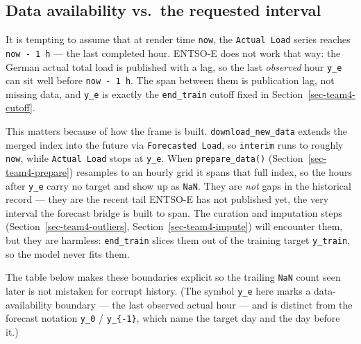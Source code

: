 \documentclass[
  english,
  letterpaper,
]{scrbook}
\begin{document}
\subsection{Data availability vs.~the requested
interval}\label{sec-team4-availability}

It is tempting to assume that at render time \texttt{now}, the
\texttt{Actual\ Load} series reaches \texttt{now\ -\ 1\ h} --- the last
completed hour. ENTSO-E does not work that way: the German actual total
load is published with a lag, so the last \emph{observed} hour
\texttt{y\_e} can sit well before \texttt{now\ -\ 1\ h}. The span
between them is publication lag, not missing data, and \texttt{y\_e} is
exactly the \texttt{end\_train} cutoff fixed in
Section~\ref{sec-team4-cutoff}.

This matters because of how the frame is built.
\texttt{download\_new\_data} extends the merged index into the future
via \texttt{Forecasted\ Load}, so \texttt{interim} runs to roughly
\texttt{now}, while \texttt{Actual\ Load} stops at \texttt{y\_e}. When
\texttt{prepare\_data()} (Section~\ref{sec-team4-prepare}) resamples to
an hourly grid it spans that full index, so the hours after
\texttt{y\_e} carry no target and show up as \texttt{NaN}. They are
\emph{not} gaps in the historical record --- they are the recent tail
ENTSO-E has not published yet, the very interval the forecast bridge is
built to span. The curation and imputation steps
(Section~\ref{sec-team4-outliers}, Section~\ref{sec-team4-impute}) will
encounter them, but they are harmless: \texttt{end\_train} slices them
out of the training target \texttt{y\_train}, so the model never fits
them.

The table below makes these boundaries explicit so the trailing
\texttt{NaN} count seen later is not mistaken for corrupt history. (The
symbol \texttt{y\_e} here marks a data-availability boundary --- the
last observed actual hour --- and is distinct from the forecast notation
\texttt{y\_0} / \texttt{y\_\{-1\}}, which name the target day and the
day before it.)
\end{document}
